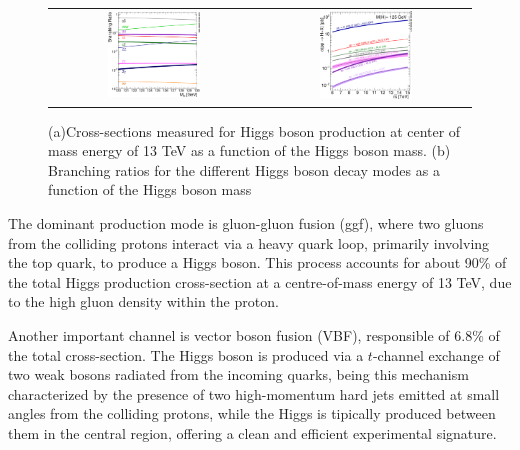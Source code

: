 \begin{figure}[htbp]
        \centering
        \begin{tabular}{cc}
        \includegraphics[width=0.46\textwidth]{images/higgs_dec.pdf} & 
        \includegraphics[width=0.46\textwidth]{images/higgs_prod.pdf}
        \end{tabular}
        \caption{ (a)Cross-sections measured for Higgs boson production at center of mass energy of 13 TeV as a function
        of the Higgs boson mass. (b) Branching ratios for the different Higgs boson decay modes as a function of the Higgs boson mass~\cite{Nature_ATLAS}}
        \label{fig:higgs_comb}
    \end{figure}

The dominant production mode is gluon-gluon fusion (\acrshort{ggf}), where two gluons from the colliding protons interact via a heavy quark loop, primarily involving the top quark, to produce a Higgs boson. This process accounts for about 90\% of the total Higgs production cross-section at a centre-of-mass energy of 13 TeV, due to the high gluon density within the proton.

Another important channel is vector boson fusion (VBF), responsible of $6.8\%$ of the total cross-section. The Higgs boson is produced via a $t$-channel exchange of two weak bosons radiated from the incoming quarks, being this mechanism characterized by the presence of two high-momentum hard jets emitted at small angles from the colliding protons, while the Higgs is tipically produced between them in the central region, offering a clean and efficient experimental signature. 

